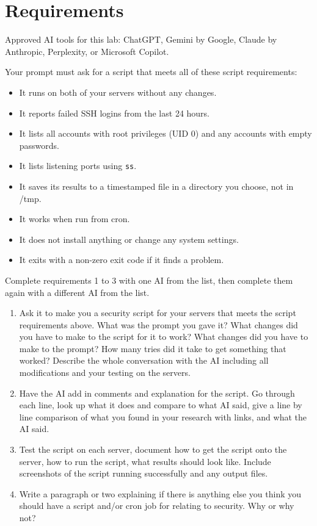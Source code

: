 \documentclass[12pt]{article}
\begin{document}
\section*{Requirements}
Approved AI tools for this lab: ChatGPT, Gemini by Google, Claude by Anthropic, Perplexity, or Microsoft Copilot.

Your prompt must ask for a script that meets all of these script requirements:
\begin{itemize}
    \item It runs on both of your servers without any changes.
    \item It reports failed SSH logins from the last 24 hours.
    \item It lists all accounts with root privileges (UID 0) and any accounts with empty passwords.
    \item It lists listening ports using \texttt{ss}.
    \item It saves its results to a timestamped file in a directory you choose, not in /tmp.
    \item It works when run from cron.
    \item It does not install anything or change any system settings.
    \item It exits with a non-zero exit code if it finds a problem.
\end{itemize}

Complete requirements 1 to 3 with one AI from the list, then complete them again with a different AI from the list.
\begin{enumerate}
    \item Ask it to make you a security script for your servers that meets the script requirements above. What was the prompt you gave it? What changes did you have to make to the script for it to work? What changes did you have to make to the prompt? How many tries did it take to get something that worked? Describe the whole conversation with the AI including all modifications and your testing on the servers.
    \item Have the AI add in comments and explanation for the script.  Go through each line, look up what it does and compare to what AI said, give a line by line comparison of what you found in your research with links, and what the AI said.
    \item Test the script on each server, document how to get the script onto the server, how to run the script, what results should look like.  Include screenshots of the script running successfully and any output files.
    \item Write a paragraph or two explaining if there is anything else you think you should have a script and/or cron job for relating to security. Why or why not?
\end{enumerate}
\end{document}
